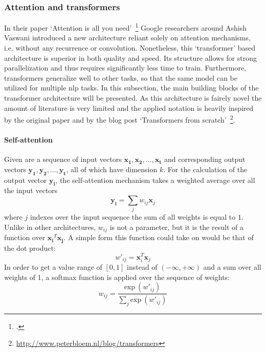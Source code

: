 \subsubsection{Attention and transformers}
\label{sub:attention_and_transformers}

In their paper `Attention is all you need'~\footcite{DBLP:journals/corr/VaswaniSPUJGKP17} Google researchers around Ashish Vaswani introduced a new architecture reliant solely on attention mechanisms, i.e. without any recurrence or convolution. Nonetheless, this `transformer' based architecture is superior in both quality and speed. Its structure allows for strong parallelization and thus requires significantly less time to train. Furthermore, transformers generalize well to other tasks, so that the same model can be utilized for multiple \gls{nlp} tasks. In this subsection, the main building blocks of the transformer architecture will be presented. As this architecture is fairely novel the amount of literature is very limited and the applied notation is heavily inspired by the original paper and by the blog post `Transformers from scratch'~\footnote{\url{http://www.peterbloem.nl/blog/transformers}}.

\paragraph{Self-attention}
Given are a sequence of input vectors $ \boldsymbol{x_1}, \boldsymbol{x_2}, \dots, \boldsymbol{x_t} $ and corresponding output vectors $ \boldsymbol{y_1}, \boldsymbol{y_2}, \dots, \boldsymbol{y_t} $, all of which have dimension $ k $. For the calculation of the output vector $ \boldsymbol{y_i} $, the self-attention mechanism takes a weighted average over all the input vectors
\begin{equation}
	\boldsymbol{y_i} = \sum_j w_{ij} \boldsymbol{x}_j
\end{equation}
where $ j $ indexes over the input sequence the sum of all weights is equal to $ 1 $. Unlike in other architectures, $ w_{ij} $ is not a parameter, but it is the result of a function over $ \boldsymbol{x_i}^T \boldsymbol{x_j} $. A simple form this function could take on would be that of the dot product:
\begin{equation}
	w'_{ij} = \boldsymbol{x}_i^T \boldsymbol{x}_j
\end{equation}
In order to get a value range of $ [0, 1] $ instead of $ (-\infty, +\infty) $ and a sum over all weights of 1, a softmax function is applied over the sequence of weights:
\begin{equation}
	w_{ij} = \frac{\text{exp} \ (w'_{ij})}{\sum_j \text{exp} \ (w'_{ij})}
\end{equation}

